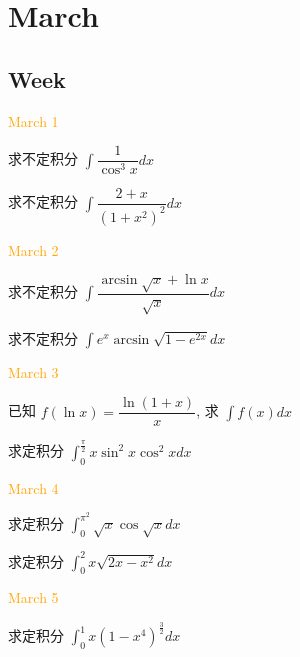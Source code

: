 \chapter{March}
\section{Week }
\textcolor{orange}{March 1}

\begin{example}[][Exam: 29.1.1]
	求不定积分 $\int\dfrac{1}{\cos^{3} x}dx$
\end{example}

\begin{example}[][Exam: 29.1.2]
	求不定积分 $\int\dfrac{2+x}{(1+x^{2})^{2}}dx$
\end{example}

\textcolor{orange}{March 2}

\begin{example}[][Exam: 29.1.3]
	求不定积分 $\int\dfrac{\arcsin\sqrt{x}+\ln x}{\sqrt{x}}dx$
\end{example}

\begin{example}[][Exam: 29.1.4]
	求不定积分 $\int e^{x}\arcsin\sqrt{1-e^{2x}}dx$
\end{example}

\textcolor{orange}{March 3}

\begin{example}[][Exam: 29.1.5]
	已知 $f(\ln x)=\dfrac{\ln(1+x)}{x}$, 求 $\int f(x)dx$
\end{example}

\begin{example}[][Exam: 29.1.6]
	求定积分 $\int_{0}^{\frac{\pi}{2}}x\sin^{2}x\cos^{2}xdx$
\end{example}

\textcolor{orange}{March 4}

\begin{example}[][Exam: 29.1.7]
	求定积分 $\int_{0}^{\pi^{2}}\sqrt{x}\cos\sqrt{x}dx$
\end{example}

\begin{example}[][Exam: 29.1.8]
	求定积分 $\int_{0}^{2}x\sqrt{2x-x^{2}}dx$
\end{example}

\textcolor{orange}{March 5}

\begin{example}[][Exam: 29.1.9]
	求定积分 $\int_{0}^{1}x(1-x^{4})^{\frac{3}{2}}dx$
\end{example}

